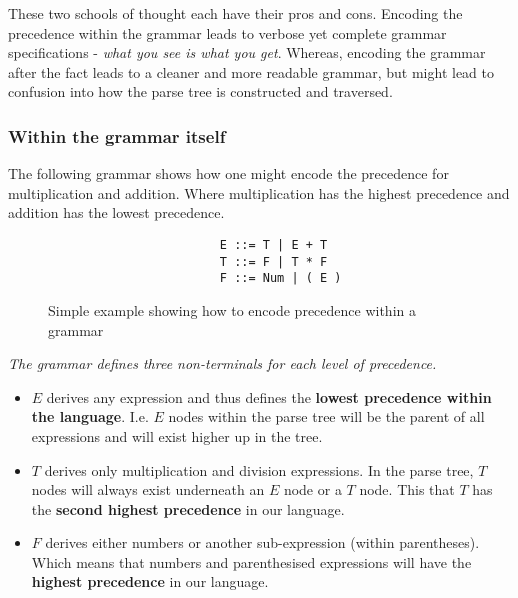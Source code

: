 These two schools of thought each have their pros and cons. Encoding the precedence within the grammar leads to verbose yet complete grammar specifications - \textit{what you see is what you get}. Whereas, encoding the grammar after the fact leads to a cleaner and more readable grammar, but might lead to confusion into how the parse tree is constructed and traversed.

\subsubsection{Within the grammar itself}

The following grammar shows how one might encode the precedence for multiplication and addition. Where multiplication has the highest precedence and addition has the lowest precedence.

\begin{figure}[H]
    \begin{center}
        \begin{verbatim}            
                        E ::= T | E + T
                        T ::= F | T * F
                        F ::= Num | ( E )
        \end{verbatim}
    \end{center}
    \vspace{-1.5em}
    \caption{\label{fig:4.5}Simple example showing how to encode precedence within a grammar}
\end{figure}

\begin{center}
    \textit{The grammar defines three non-terminals for each level of precedence.}
    \begin{itemize}
        \item $E$ derives any expression and thus defines the \textbf{lowest precedence within the language}. I.e. $E$ nodes within the parse tree will be the parent of all expressions and will exist higher up in the tree.
        \item $T$ derives only multiplication and division expressions. In the parse tree, $T$ nodes will always exist underneath an $E$ node or a $T$ node. This that $T$ has the \textbf{second highest precedence} in our language.
        \item $F$ derives either numbers or another sub-expression (within parentheses). Which means that numbers and parenthesised expressions will have the \textbf{highest precedence} in our language.\textsuperscript{\cite{abrahamson_2021}\cite{norvell_1999}}
    \end{itemize}
\end{center}

